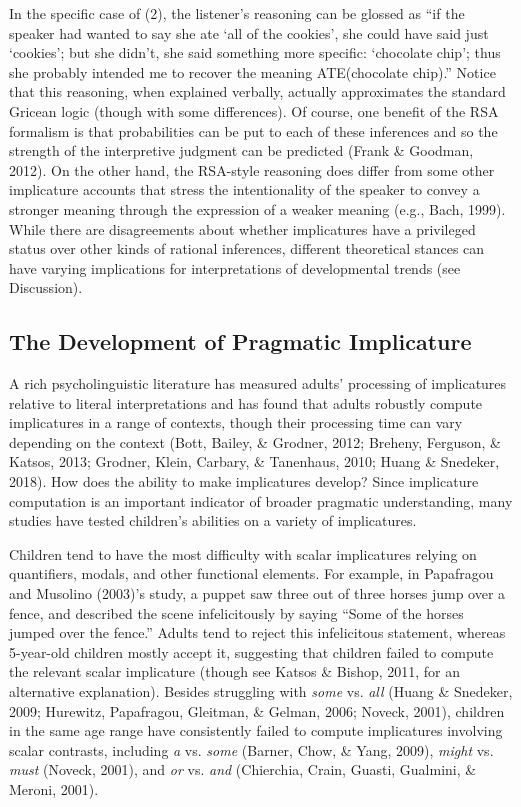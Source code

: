 \documentclass[mask,man]{apa6}
\begin{document}
In the specific case of (2), the listener's reasoning can be glossed as
\enquote{if the speaker had wanted to say she ate \enquote{all of the
cookies}, she could have said just \enquote{cookies}; but she didn't,
she said something more specific: \enquote{chocolate chip}; thus she
probably intended me to recover the meaning ATE(chocolate chip).} Notice
that this reasoning, when explained verbally, actually approximates the
standard Gricean logic (though with some differences). Of course, one
benefit of the RSA formalism is that probabilities can be put to each of
these inferences and so the strength of the interpretive judgment can be
predicted (Frank \& Goodman, 2012). On the other hand, the RSA-style
reasoning does differ from some other implicature accounts that stress
the intentionality of the speaker to convey a stronger meaning through
the expression of a weaker meaning (e.g., Bach, 1999). While there are
disagreements about whether implicatures have a privileged status over
other kinds of rational inferences, different theoretical stances can
have varying implications for interpretations of developmental trends
(see Discussion).

\subsection{The Development of Pragmatic
Implicature}\label{the-development-of-pragmatic-implicature}

A rich psycholinguistic literature has measured adults' processing of
implicatures relative to literal interpretations and has found that
adults robustly compute implicatures in a range of contexts, though
their processing time can vary depending on the context (Bott, Bailey,
\& Grodner, 2012; Breheny, Ferguson, \& Katsos, 2013; Grodner, Klein,
Carbary, \& Tanenhaus, 2010; Huang \& Snedeker, 2018). How does the
ability to make implicatures develop? Since implicature computation is
an important indicator of broader pragmatic understanding, many studies
have tested children's abilities on a variety of implicatures.

Children tend to have the most difficulty with scalar implicatures
relying on quantifiers, modals, and other functional elements. For
example, in Papafragou and Musolino (2003)'s study, a puppet saw three
out of three horses jump over a fence, and described the scene
infelicitously by saying \enquote{Some of the horses jumped over the
fence.} Adults tend to reject this infelicitous statement, whereas
5-year-old children mostly accept it, suggesting that children failed to
compute the relevant scalar implicature (though see Katsos \& Bishop,
2011, for an alternative explanation). Besides struggling with
\emph{some} vs. \emph{all} (Huang \& Snedeker, 2009; Hurewitz,
Papafragou, Gleitman, \& Gelman, 2006; Noveck, 2001), children in the
same age range have consistently failed to compute implicatures
involving scalar contrasts, including \emph{a} vs. \emph{some} (Barner,
Chow, \& Yang, 2009), \emph{might} vs. \emph{must} (Noveck, 2001), and
\emph{or} vs. \emph{and} (Chierchia, Crain, Guasti, Gualmini, \& Meroni,
2001).
\end{document}
